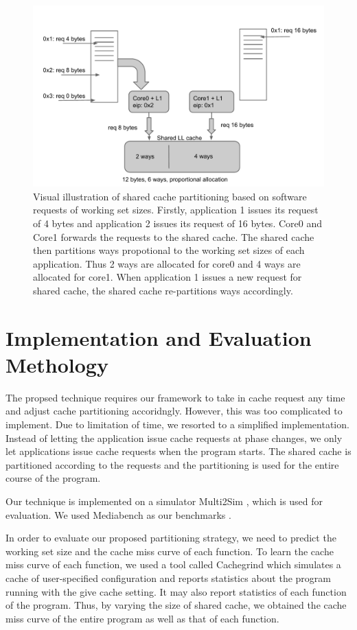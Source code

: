 \documentclass{acm_proc_article-sp}
\begin{document}
\begin{figure}[th!]
  \label{fig:hinted_partition}
  \centering
  \includegraphics[width=.5\textwidth]{figs/hinted_partition.pdf}
  \caption{\small Visual illustration of shared cache partitioning based on software 
    requests of working set sizes. Firstly, application 1 issues its request 
    of 4 bytes and application 2 issues its request of 16 bytes. Core0 and Core1 
  forwards the requests to the shared cache. The shared cache then partitions 
  ways propotional to the working set sizes of each application. Thus 2 ways are 
  allocated for core0 and 4 ways are allocated for core1. When application 1 issues
  a new request for shared cache, the shared cache re-partitions ways 
  accordingly.}
\end{figure}



\section{Implementation and Evaluation Methology}

The propsed technique requires our framework to take in cache request any time 
and adjust cache partitioning accoridngly. However, this was too complicated to
implement. Due to limitation of time, we resorted to a simplified 
implementation. Instead of letting the application issue cache requests at 
phase changes, we only let applications issue cache requests when the program
starts. The shared cache is partitioned according to the requests and the 
partitioning is used for the entire course of the program.

Our technique is implemented on a simulator Multi2Sim \cite{multi2sim}, 
which is used for evaluation. We used Mediabench as our benchmarks 
\cite{mediabench}.

In order to evaluate our proposed partitioning strategy, we need to predict the 
working set size and the cache miss curve of each function. To learn the cache 
miss curve of each function, we used a tool called Cachegrind \cite{cachegrind}
which simulates a cache of user-specified configuration and reports statistics 
about the program running with the give cache setting. It may also report 
statistics of each function of the program. Thus, by varying the size of shared 
cache, we obtained the cache miss curve of the entire program as well as that of
 each function.
\end{document}
